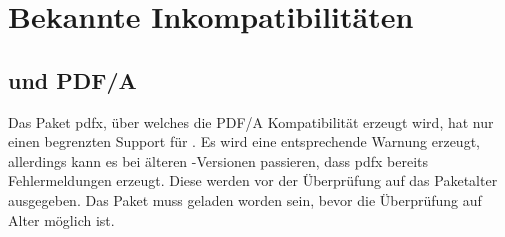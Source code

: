 \documentclass[
	ngerman,
	accentcolor=9c,%
	]{tudapub}
\let\pck\textsf
\begin{document}
\printbibliography


\section{Bekannte Inkompatibilitäten}

\subsection{\texorpdfstring{}{XeLaTeX} und PDF/A}
Das Paket \pck{pdfx}, über welches die PDF/A Kompatibilität erzeugt wird, hat nur einen begrenzten Support für .
Es wird eine entsprechende Warnung erzeugt, allerdings kann es bei älteren -Versionen passieren, dass \pck{pdfx} bereits Fehlermeldungen erzeugt. Diese werden vor der Überprüfung auf das Paketalter ausgegeben. Das Paket muss geladen worden sein, bevor die Überprüfung auf Alter möglich ist.
\end{document}
